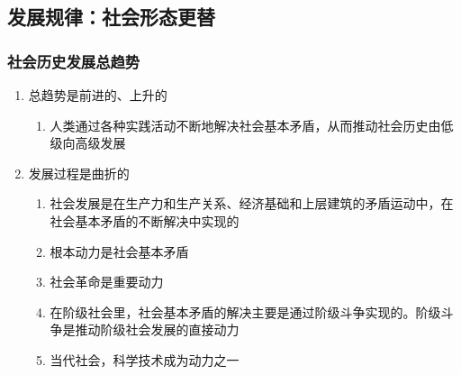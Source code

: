 \documentclass[12pt]{book}
\begin{document}
\subsection{发展规律：社会形态更替}

\subsubsection{社会历史发展总趋势}




\begin{enumerate}[1.]
    \item 总趋势是前进的、上升的
          \begin{enumerate}[(1)]
              \item 人类通过各种实践活动不断地解决社会基本矛盾，从而推动社会历史由低级向高级发展
          \end{enumerate}
    \item 发展过程是曲折的
          \begin{enumerate}[(1)]
              \item 社会发展是在生产力和生产关系、经济基础和上层建筑的矛盾运动中，在社会基本矛盾的不断解决中实现的
              \item 根本动力是社会基本矛盾
              \item 社会革命是重要动力
              \item ​在阶级社会里，社会基本矛盾的解决主要是通过阶级斗争实现的。阶级斗争是推动阶级社会发展的直接动力
              \item 当代社会，科学技术成为动力之一
          \end{enumerate}
\end{enumerate}





\end{document}
